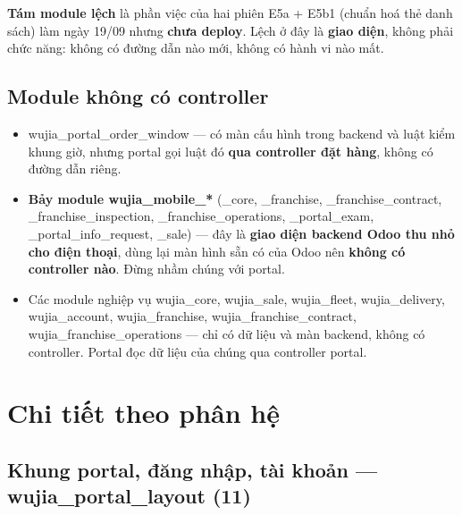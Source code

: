 \documentclass[11pt,a4paper]{report}
\newcommand{\rt}[1]{{\ttfamily\footnotesize #1}}
\begin{document}
\textbf{Tám module lệch} là phần việc của hai phiên E5a + E5b1 (chuẩn hoá thẻ danh sách) làm
ngày 19/09 nhưng \textbf{chưa deploy}. Lệch ở đây là \textbf{giao diện}, không phải chức năng:
không có đường dẫn nào mới, không có hành vi nào mất.

\section{Module không có controller}

\begin{itemize}[leftmargin=*]
  \item \rt{wujia\_portal\_order\_window} — có màn cấu hình trong backend và luật kiểm khung
        giờ, nhưng portal gọi luật đó \textbf{qua controller đặt hàng}, không có đường dẫn riêng.
  \item \textbf{Bảy module \rt{wujia\_mobile\_*}} (\rt{\_core}, \rt{\_franchise},
        \rt{\_franchise\_contract}, \rt{\_franchise\_inspection}, \rt{\_franchise\_operations},
        \rt{\_portal\_exam}, \rt{\_portal\_info\_request}, \rt{\_sale}) — đây là \textbf{giao diện
        backend Odoo thu nhỏ cho điện thoại}, dùng lại màn hình sẵn có của Odoo nên
        \textbf{không có controller nào}. Đừng nhầm chúng với portal.
  \item Các module nghiệp vụ \rt{wujia\_core}, \rt{wujia\_sale}, \rt{wujia\_fleet},
        \rt{wujia\_delivery}, \rt{wujia\_account}, \rt{wujia\_franchise},
        \rt{wujia\_franchise\_contract}, \rt{wujia\_franchise\_operations} — chỉ có dữ liệu và
        màn backend, không có controller. Portal đọc dữ liệu của chúng qua controller portal.
\end{itemize}

\chapter{Chi tiết theo phân hệ}

\section{Khung portal, đăng nhập, tài khoản --- \rt{wujia\_portal\_layout} (11)}
\end{document}
